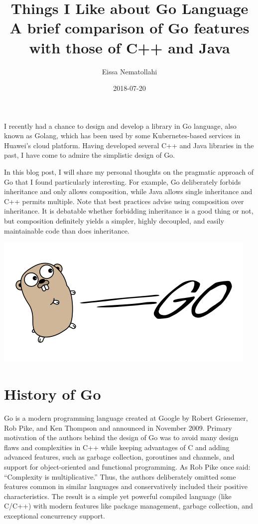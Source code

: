 \documentclass[11pt]{article}
\author{Eissa Nematollahi}
\date{2018-07-20}
\title{Things I Like about Go Language\\\medskip
\large A brief comparison of Go features with those of C++ and Java}
\begin{document}
\maketitle
\tableofcontents
\clearpage 
I recently had a chance to design and develop a library in Go language, also known as Golang, which has been used by some Kubernetes-based services in Huawei's cloud platform. Having developed several C++ and Java libraries in the past, I have come to admire the simplistic design of Go.

In this blog post, I will share my personal thoughts on the pragmatic approach of Go that I found particularly interesting. For example, Go deliberately forbids inheritance and only allows composition, while Java allows single inheritance and C++ permits multiple. Note that best practices advise using composition over inheritance. It is debatable whether forbidding inheritance is a good thing or not, but composition definitely yields a simpler, highly decoupled, and easily maintainable code than does inheritance.

\includegraphics[width=.9\linewidth]{./images/golang-card.png}

\section{History of Go}
\label{sec:orgheadline1}
Go is a modern programming language created at Google by Robert Griesemer, Rob Pike, and Ken Thompson and announced in November 2009. Primary motivation of the authors behind the design of Go was to avoid many design flaws and complexities in C++ while keeping advantages of C and adding advanced features, such as garbage collection, goroutines and channels, and support for object-oriented and functional programming. As Rob Pike once said: ``Complexity is multiplicative.'' Thus, the authors deliberately omitted some features common in similar languages and conservatively included their positive characteristics. The result is a simple yet powerful compiled language (like C/C++) with modern features like package management, garbage collection, and exceptional concurrency support.
\end{document}
